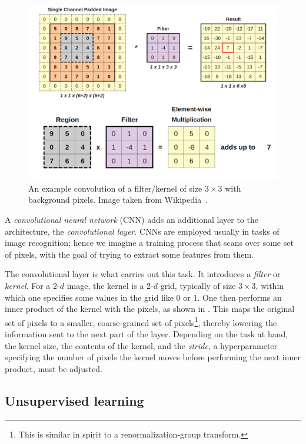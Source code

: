 \begin{figure}
\includegraphics[width=\linewidth]{figs/CNN_filter.png}
\caption{An example convolution of a filter/kernel
of size $3\times 3$ with background pixels.
Image taken from Wikipedia~\cite{wikiCNN}.}
\label{fig:CNN}
\end{figure}

A {\it convolutional neural network} (CNN) 
adds an additional layer to the architecture, the 
{\it convolutional layer}. CNNs are employed usually 
in tasks of image recognition; hence we imagine a training process that scans
over some set of pixels, with the goal of trying to extract some features from
them.

The convolutional layer is what carries out this task. It introduces a 
{\it filter} or {\it kernel}. For a 2-$d$ image, the
kernel is a 2-$d$ grid, typically of size $3\times 3$, within which one
specifies some values in the grid like 0 or 1. One then performs an inner
product of the kernel with the pixels, as shown in . This maps
the original set of pixels to a smaller, coarse-grained set of 
pixels\footnote{This is similar in spirit to a renormalization-group transform.},
thereby lowering the information sent to the next part of the layer.
Depending on the task at hand, the kernel size, the contents of the kernel,
and the {\it stride}, a hyperparameter specifying 
the number of pixels the kernel moves before
performing the next inner product, must be adjusted.

\subsection{Unsupervised learning}


